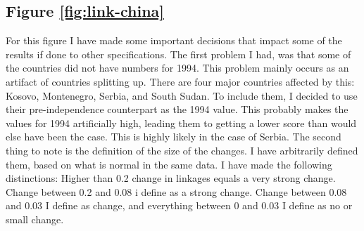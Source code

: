 \subsection{Figure \ref{fig:link-china}}
For this figure I have made some important decisions that impact some of the results if done to other specifications. The first problem I had, was that some of the countries did not have numbers for 1994. This problem mainly occurs as an artifact of countries splitting up. There are four major countries affected by this: Kosovo, Montenegro, Serbia, and South Sudan. To include them, I decided to use their pre-independence counterpart as the 1994 value. This probably makes the values for 1994 artificially high, leading them to getting a lower score than would else have been the case. This is highly likely in the case of Serbia. The second thing to note is the definition of the size of the changes. I have arbitrarily defined them, based on what is normal in the same data. I have made the following distinctions: Higher than 0.2 change in linkages equals a very strong change. Change between 0.2 and 0.08 i define as a strong change. Change between 0.08 and 0.03 I define as change, and everything between 0 and 0.03 I define as no or small change. 